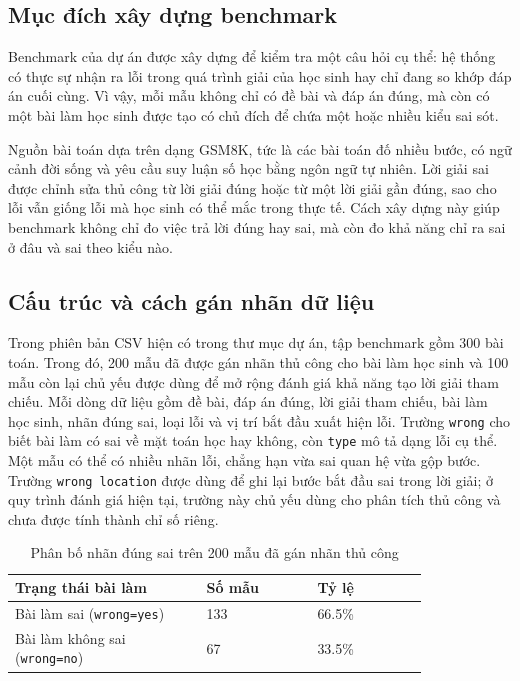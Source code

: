 \documentclass[12pt,a4paper]{article}
\begin{document}
\subsection{Mục đích xây dựng benchmark}

Benchmark của dự án được xây dựng để kiểm tra một câu hỏi cụ thể: hệ thống có
thực sự nhận ra lỗi trong quá trình giải của học sinh hay chỉ đang so khớp đáp
án cuối cùng. Vì vậy, mỗi mẫu không chỉ có đề bài và đáp án đúng, mà còn có một
bài làm học sinh được tạo có chủ đích để chứa một hoặc nhiều kiểu sai sót.

Nguồn bài toán dựa trên dạng GSM8K, tức là các bài toán đố nhiều bước, có ngữ
cảnh đời sống và yêu cầu suy luận số học bằng ngôn ngữ tự nhiên. Lời giải sai
được chỉnh sửa thủ công từ lời giải đúng hoặc từ một lời giải gần đúng, sao cho
lỗi vẫn giống lỗi mà học sinh có thể mắc trong thực tế. Cách xây dựng này giúp
benchmark không chỉ đo việc trả lời đúng hay sai, mà còn đo khả năng chỉ ra sai
ở đâu và sai theo kiểu nào.

\subsection{Cấu trúc và cách gán nhãn dữ liệu}

Trong phiên bản CSV hiện có trong thư mục dự án, tập benchmark gồm 300 bài toán.
Trong đó, 200 mẫu đã được gán nhãn thủ công cho bài làm học sinh và 100 mẫu còn
lại chủ yếu được dùng để mở rộng đánh giá khả năng tạo lời giải tham chiếu. Mỗi
dòng dữ liệu gồm đề bài, đáp án đúng, lời giải tham chiếu, bài làm học sinh, nhãn
đúng sai, loại lỗi và vị trí bắt đầu xuất hiện lỗi. Trường \texttt{wrong} cho
biết bài làm có sai về mặt toán học hay không, còn \texttt{type} mô tả dạng lỗi
cụ thể. Một mẫu có thể có nhiều nhãn lỗi, chẳng hạn vừa sai quan hệ vừa gộp
bước. Trường \texttt{wrong location} được dùng để ghi lại bước bắt đầu sai trong
lời giải; ở quy trình đánh giá hiện tại, trường này chủ yếu dùng cho phân tích
thủ công và chưa được tính thành chỉ số riêng.

\begin{table}[H]
    \centering
    \begin{tabular}{p{0.38\linewidth} p{0.22\linewidth} p{0.22\linewidth}}
        \toprule
        \textbf{Trạng thái bài làm} & \textbf{Số mẫu} & \textbf{Tỷ lệ} \\
        \midrule
        Bài làm sai (\texttt{wrong=yes}) & 133 & 66.5\% \\
        Bài làm không sai (\texttt{wrong=no}) & 67 & 33.5\% \\
        \bottomrule
    \end{tabular}
    \caption{Phân bố nhãn đúng sai trên 200 mẫu đã gán nhãn thủ công}
\end{table}
\end{document}
